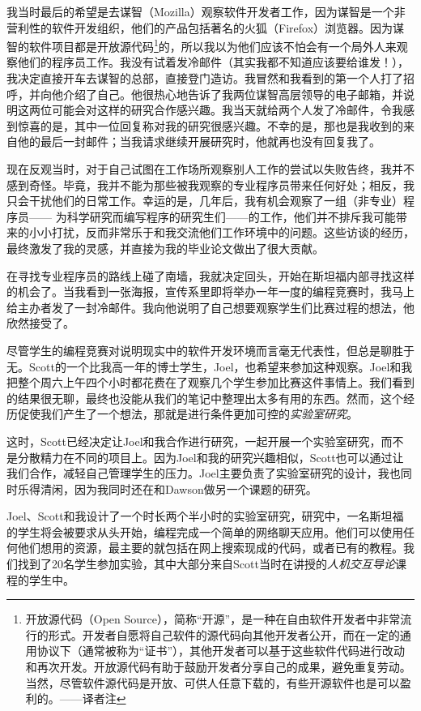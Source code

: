 \documentclass[12pt,UTF8,nofonts]{book}
\begin{document}
我当时最后的希望是去谋智（Mozilla）观察软件开发者工作，因为谋智是一个非营利性的软件开发组织，他们的产品包括著名的火狐（Firefox）浏览器。因为谋智的软件项目都是开放源代码\footnote{开放源代码（Open Source），简称“开源”，是一种在自由软件开发者中非常流行的形式。开发者自愿将自己软件的源代码向其他开发者公开，而在一定的通用协议下（通常被称为“证书”），其他开发者可以基于这些软件代码进行改动和再次开发。开放源代码有助于鼓励开发者分享自己的成果，避免重复劳动。当然，尽管软件源代码是开放、可供人任意下载的，有些开源软件也是可以盈利的。——译者注}的，所以我以为他们应该不怕会有一个局外人来观察他们的程序员工作。我没有试着发冷邮件（其实我都不知道应该要给谁发！），我决定直接开车去谋智的总部，直接登门造访。我冒然和我看到的第一个人打了招呼，并向他介绍了自己。他很热心地告诉了我两位谋智高层领导的电子邮箱，并说明这两位可能会对这样的研究合作感兴趣。我当天就给两个人发了冷邮件，令我感到惊喜的是，其中一位回复称对我的研究很感兴趣。不幸的是，那也是我收到的来自他的最后一封邮件；当我请求继续开展研究时，他就再也没有回复我了。

现在反观当时，对于自己试图在工作场所观察别人工作的尝试以失败告终，我并不感到奇怪。毕竟，我并不能为那些被我观察的专业程序员带来任何好处；相反，我只会干扰他们的日常工作。幸运的是，几年后，我有机会观察了一组（非专业）程序员—— 为科学研究而编写程序的研究生们——的工作，他们并不排斥我可能带来的小小打扰，反而非常乐于和我交流他们工作环境中的问题。这些访谈的经历，最终激发了我的灵感，并直接为我的毕业论文做出了很大贡献。

\breakline

在寻找专业程序员的路线上碰了南墙，我就决定回头，开始在斯坦福内部寻找这样的机会了。当我看到一张海报，宣传系里即将举办一年一度的编程竞赛时，我马上给主办者发了一封冷邮件。我向他说明了自己想要观察学生们比赛过程的想法，他欣然接受了。

尽管学生的编程竞赛对说明现实中的软件开发环境而言毫无代表性，但总是聊胜于无。Scott的一个比我高一年的博士学生，Joel，也希望来参加这种观察。Joel和我把整个周六上午四个小时都花费在了观察几个学生参加比赛这件事情上。我们看到的结果很无聊，最终也没能从我们的笔记中整理出太多有用的东西。然而，这个经历促使我们产生了一个想法，那就是进行条件更加可控的\emph{实验室研究}。

这时，Scott已经决定让Joel和我合作进行研究，一起开展一个实验室研究，而不是分散精力在不同的项目上。因为Joel和我的研究兴趣相似，Scott也可以通过让我们合作，减轻自己管理学生的压力。Joel主要负责了实验室研究的设计，我也同时乐得清闲，因为我同时还在和Dawson做另一个课题的研究。

Joel、Scott和我设计了一个时长两个半小时的实验室研究，研究中，一名斯坦福的学生将会被要求从头开始，编程完成一个简单的网络聊天应用。他们可以使用任何他们想用的资源，最主要的就包括在网上搜索现成的代码，或者已有的教程。我们找到了20名学生参加实验，其中大部分来自Scott当时在讲授的\emph{人机交互导论}课程的学生中。
\end{document}
